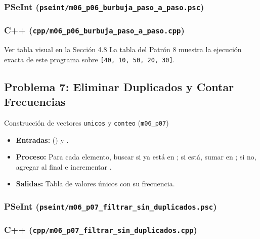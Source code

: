 \documentclass[11pt,letterpaper]{article}
\begin{document}
\subsubsection*{PSeInt (\texttt{pseint/m06\_p06\_burbuja\_paso\_a\_paso.psc})}


\subsubsection*{C++ (\texttt{cpp/m06\_p06\_burbuja\_paso\_a\_paso.cpp})}


\begin{pruebaescritorio}{Ver tabla visual en la Sección 4.8}
La tabla del Patrón 8 muestra la ejecución exacta de este programa sobre \texttt{[40, 10, 50, 20, 30]}.
\end{pruebaescritorio}

\subsection{Problema 7: Eliminar Duplicados y Contar Frecuencias}
\begin{analisis}{Construcción de vectores \texttt{unicos} y \texttt{conteo} (\texttt{m06\_p07})}
\begin{itemize}
  \item \textbf{Entradas:}  () y .
  \item \textbf{Proceso:} Para cada elemento, buscar si ya está en ; si está, sumar en ; si no, agregar al final e incrementar .
  \item \textbf{Salidas:} Tabla de valores únicos con su frecuencia.
\end{itemize}
\end{analisis}

\subsubsection*{PSeInt (\texttt{pseint/m06\_p07\_filtrar\_sin\_duplicados.psc})}


\subsubsection*{C++ (\texttt{cpp/m06\_p07\_filtrar\_sin\_duplicados.cpp})}

\end{document}
